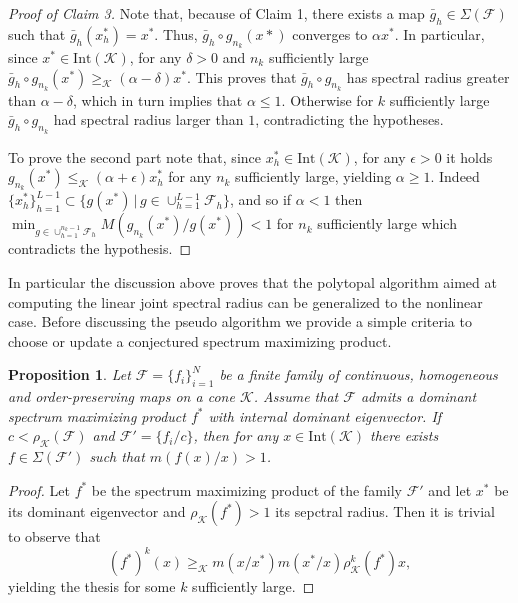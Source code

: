 \documentclass{article}
\newtheorem{proposition}[theorem]{Proposition}
\newcommand{\family}{\mathcal{F}}
\newcommand{\cradius}{\rho_{\cone}}
\newcommand{\cone}{\mathcal{K}}
\newcommand{\interior}{\mathrm{Int}}
\newcommand{\cgeq}{\geq_{\cone}}
\newcommand{\cleq}{\leq_{\cone}}
\begin{document}
\begin{proof}[Proof of Claim 3]
Note that, because of Claim 1, there exists a map $\bar{g}_h\in \Sigma(\family)$ such that $\bar{g}_h(x_h^*)=x^*$. 
%
Thus, $\bar{g}_h\circ g_{n_k}(x*)$ converges to $\alpha x^*$. 
%
In particular, since $x^*\in\interior(\cone)$, for any $\delta>0$ and $n_k$ sufficiently large $\bar{g}_h\circ g_{n_k}(x^*)\cgeq (\alpha-\delta)x^*$. 
%
This proves that $\bar{g}_h\circ g_{n_k}$ has spectral radius greater than $\alpha-\delta$, which in turn implies that $\alpha\leq 1$.
Otherwise for $k$
sufficiently large $\bar{g}_h \circ g_{n_k}$ had spectral radius larger than $1$, contradicting the hypotheses.

To prove the second part note that, since $x_h^*\in \interior(\cone)$, for any $\epsilon>0$ it holds $g_{n_k}(x^*)\cleq (\alpha+\epsilon) x_h^* $ for any $n_k$ sufficiently large, yielding $\alpha\geq 1$.
%
Indeed $\{x_{h}^*\}_{h=1}^{L-1}\subset \{g(x^*)\,|\,g \in \cup_{h=1}^{L-1}\family_h \}$, and so if $\alpha<1$ then  $\min_{g\in \cup_{h=1}^{n_k-1}\family_h} M(g_{n_k}(x^*)/g(x^*))<1$ for $n_k$ sufficiently large which contradicts the hypothesis.
%
%
\end{proof}

In particular the discussion above proves that the polytopal algorithm aimed at computing the linear joint spectral radius can be generalized to the nonlinear case. Before discussing the pseudo algorithm we provide a simple criteria to choose or update a conjectured spectrum maximizing product.


\begin{proposition}\label{prop_Finite_convergence_of_algorithm_spectrum_max_update}
    Let $\family=\{f_i\}_{i=1}^N$ be a finite family of continuous, homogeneous and order-preserving maps on a cone $\cone$. Assume that $\family$ admits a dominant spectrum maximizing product $f^*$ with internal dominant eigenvector. If $c< \cradius(\family)$ and $\family'=\{f_i/c\}$, then for any $x\in \interior(\cone)$ there exists $f\in \Sigma(\family')$ such that $m(f(x)/x)> 1$.    
\end{proposition}
\begin{proof}
    Let $f^*$ be the spectrum maximizing product of the family $\family'$ and let $x^*$ be its dominant eigenvector and $\cradius(f^*)>1$ its sepctral radius. Then it is trivial to observe that
    \begin{equation}
       (f^*)^k(x)\cgeq m(x/x^*)m(x^*/x)\cradius^k(f^*)x,
    \end{equation}
    yielding the thesis for some $k$ sufficiently large.
\end{proof}
\end{document}
